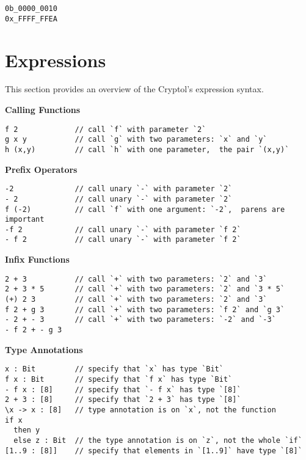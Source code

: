 \begin{verbatim}
0b_0000_0010
0x_FFFF_FFEA
\end{verbatim}

\hypertarget{expressions}{%
\section{Expressions}\label{expressions}}

This section provides an overview of the Cryptol's expression syntax.

\textbf{Calling Functions}

\begin{verbatim}
f 2             // call `f` with parameter `2`
g x y           // call `g` with two parameters: `x` and `y`
h (x,y)         // call `h` with one parameter,  the pair `(x,y)`
\end{verbatim}

\textbf{Prefix Operators}

\begin{verbatim}
-2              // call unary `-` with parameter `2`
- 2             // call unary `-` with parameter `2`
f (-2)          // call `f` with one argument: `-2`,  parens are important
-f 2            // call unary `-` with parameter `f 2`
- f 2           // call unary `-` with parameter `f 2`
\end{verbatim}

\textbf{Infix Functions}

\begin{verbatim}
2 + 3           // call `+` with two parameters: `2` and `3`
2 + 3 * 5       // call `+` with two parameters: `2` and `3 * 5`
(+) 2 3         // call `+` with two parameters: `2` and `3`
f 2 + g 3       // call `+` with two parameters: `f 2` and `g 3`
- 2 + - 3       // call `+` with two parameters: `-2` and `-3`
- f 2 + - g 3
\end{verbatim}

\textbf{Type Annotations}

\begin{verbatim}
x : Bit         // specify that `x` has type `Bit`
f x : Bit       // specify that `f x` has type `Bit`
- f x : [8]     // specify that `- f x` has type `[8]`
2 + 3 : [8]     // specify that `2 + 3` has type `[8]`
\x -> x : [8]   // type annotation is on `x`, not the function
if x
  then y
  else z : Bit  // the type annotation is on `z`, not the whole `if`
[1..9 : [8]]    // specify that elements in `[1..9]` have type `[8]`
\end{verbatim}

